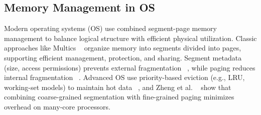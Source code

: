 \documentclass[11pt]{article}
\begin{document}

\subsection{Memory Management in OS}



Modern operating systems (OS) use combined segment-page memory management to balance logical structure with efficient physical utilization.
Classic approaches like Multics ~\cite{bensoussan1972multics} organize memory into segments divided into pages, supporting efficient management, protection, and sharing. Segment metadata (size, access permissions) prevents external fragmentation ~\cite{bensoussan1972multics}, while paging reduces internal fragmentation ~\cite{denning1970virtual}. Advanced OS use priority-based eviction (e.g., LRU, working-set models) to maintain hot data ~\cite{denning1970virtual}, and Zheng et al. ~\cite{zheng2020segmentpage} show that combining coarse-grained segmentation with fine-grained paging minimizes overhead on many-core processors.
\end{document}
